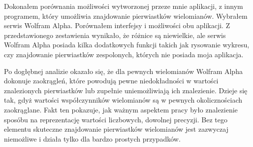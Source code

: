 Dokonałem porównania możliwości wytworzonej przeze mnie aplikacji, z innym programem, który umożliwia znajdowanie pierwiastków wielomianów. Wybrałem serwis Wolfram Alpha. Porównałem interfejsy i możliwości obu aplikacji. Z przedstawionego zestawienia wynikało, że różnice są niewielkie, ale serwis Wolfram Alpha posiada kilka dodatkowych funkcji takich jak rysowanie wykresu, czy znajdowanie pierwiastków zespolonych, których nie posiada moja aplikacja.

Po dogłębnej analizie okazało się, że dla pewnych wielomianów Wolfram Alpha dokonuje zaokrągleń, które powodują pewne niedokładności w wartości znalezionych pierwiastków lub zupełnie uniemożliwiają ich znalezienie. Dzieje się tak, gdyż wartości współczynników wielomianów są w pewnych okolicznościach zaokrąglane. Fakt ten pokazuje, jak ważnym aspektem pracy było znalezienie sposóbu na reprezentację wartości liczbowych, dowolnej precyzji. Bez tego elementu skuteczne znajdowanie pierwiastków wielomianów jest zazwyczaj niemożliwe i działa tylko dla bardzo prostych przypadków.

